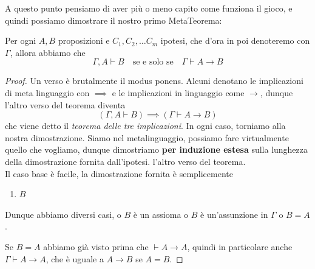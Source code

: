 \documentclass[11pt]{scrartcl}
\begin{document}
	A questo punto pensiamo di aver più o meno capito come funziona il gioco, e quindi possiamo dimostrare il nostro primo MetaTeorema:
	\begin{metateorema}[di Deduzione]
		Per ogni $A,B$ proposizioni e $C_1,C_2,\dots C_m$ ipotesi, che d'ora in poi denoteremo con $\Gamma$, allora abbiamo che
		$$\Gamma, A \vdash B \quad\text{se e solo se}\quad \Gamma \vdash A \to B$$
	\end{metateorema}
	\begin{proof}
		Un verso è brutalmente il modus ponens. Alcuni denotano le implicazioni di meta linguaggio con $\implies$ e le implicazioni in linguaggio come $\to$, dunque l'altro verso del teorema diventa
		$$(\Gamma,A\vdash B) \implies (\Gamma \vdash A \rightarrow B)$$
		che viene detto il \textit{teorema delle tre implicazioni}. In ogni caso, torniamo alla nostra dimostrazione. Siamo nel metalinguaggio, possiamo fare virtualmente quello che vogliamo, dunque dimostriamo \textbf{per induzione estesa} sulla lunghezza della dimostrazione fornita dall'ipotesi. l'altro verso del teorema. \\
		Il caso base è facile, la dimostrazione fornita è semplicemente
		\begin{enumerate}
			\item $B$
		\end{enumerate}
		Dunque abbiamo diversi casi, o $B$ è un assioma o $B$ è un'assunzione in $\Gamma$ o $B=A$.
		 
		Se $B=A$ abbiamo già visto prima che $\vdash A\to A$, quindi in particolare anche $\Gamma \vdash A \to A$, che è uguale a $A\to B$ se $A=B$. 
		

\end{proof}
\end{document}
